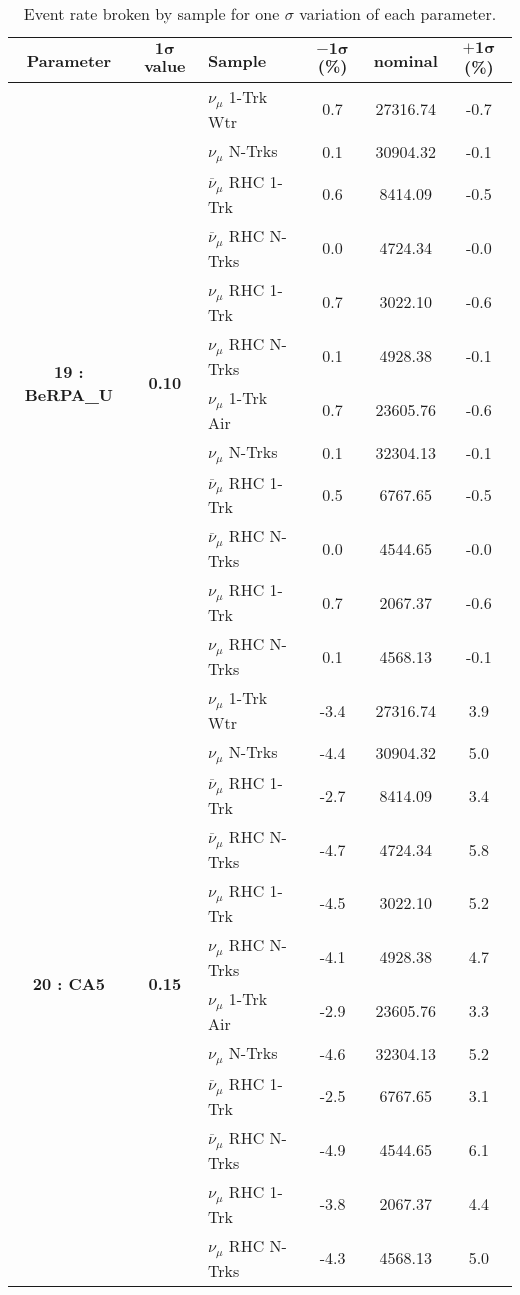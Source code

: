 \addtocounter{table}{-1}
\begin{table}[ht!]
\centering
\begin{tabular}{ c  c  l  c  c  c }
\midrule[1.3pt]
\textbf{Parameter} & \textbf{$\mathbf{1\sigma}$ value} & \textbf{Sample} & \textbf{$\mathbf{-1\sigma}$ (\%)}  &  \textbf{nominal}  &  \textbf{$\mathbf{+1\sigma}$ (\%)} \\
\midrule[1.3pt]
\multirow{12}{*}{\textbf{19 : BeRPA\_U}} & \multirow{12}{*}{\textbf{0.10}} & $\nu_\mu$ 1-Trk Wtr &   0.7 &  27316.74 &   -0.7 \\ 
 &  & $\nu_\mu$ N-Trks &   0.1 &  30904.32 &   -0.1 \\ 
 &  & $\overline{\nu}_\mu$ RHC 1-Trk &   0.6 &  8414.09 &   -0.5 \\ 
 &  & $\overline{\nu}_\mu$ RHC N-Trks &   0.0 &  4724.34 &   -0.0 \\ 
 &  & $\nu_\mu$ RHC 1-Trk &   0.7 &  3022.10 &   -0.6 \\ 
 &  & $\nu_\mu$ RHC N-Trks &   0.1 &  4928.38 &   -0.1 \\ 
 &  & $\nu_\mu$ 1-Trk Air &   0.7 &  23605.76 &   -0.6 \\ 
 &  & $\nu_\mu$ N-Trks &   0.1 &  32304.13 &   -0.1 \\ 
 &  & $\overline{\nu}_\mu$ RHC 1-Trk &   0.5 &  6767.65 &   -0.5 \\ 
 &  & $\overline{\nu}_\mu$ RHC N-Trks &   0.0 &  4544.65 &   -0.0 \\ 
 &  & $\nu_\mu$ RHC 1-Trk &   0.7 &  2067.37 &   -0.6 \\ 
 &  & $\nu_\mu$ RHC N-Trks &   0.1 &  4568.13 &   -0.1 \\ 
\midrule[1.3pt]
\multirow{12}{*}{\textbf{20 : CA5}} & \multirow{12}{*}{\textbf{0.15}} & $\nu_\mu$ 1-Trk Wtr &   -3.4 &  27316.74 &   3.9 \\ 
 &  & $\nu_\mu$ N-Trks &   -4.4 &  30904.32 &   5.0 \\ 
 &  & $\overline{\nu}_\mu$ RHC 1-Trk &   -2.7 &  8414.09 &   3.4 \\ 
 &  & $\overline{\nu}_\mu$ RHC N-Trks &   -4.7 &  4724.34 &   5.8 \\ 
 &  & $\nu_\mu$ RHC 1-Trk &   -4.5 &  3022.10 &   5.2 \\ 
 &  & $\nu_\mu$ RHC N-Trks &   -4.1 &  4928.38 &   4.7 \\ 
 &  & $\nu_\mu$ 1-Trk Air &   -2.9 &  23605.76 &   3.3 \\ 
 &  & $\nu_\mu$ N-Trks &   -4.6 &  32304.13 &   5.2 \\ 
 &  & $\overline{\nu}_\mu$ RHC 1-Trk &   -2.5 &  6767.65 &   3.1 \\ 
 &  & $\overline{\nu}_\mu$ RHC N-Trks &   -4.9 &  4544.65 &   6.1 \\ 
 &  & $\nu_\mu$ RHC 1-Trk &   -3.8 &  2067.37 &   4.4 \\ 
 &  & $\nu_\mu$ RHC N-Trks &   -4.3 &  4568.13 &   5.0 \\ 
\midrule[1.3pt]
\end{tabular}
\centering
\caption{Event rate broken by sample for one $\sigma$ variation of each parameter.}
\end{table}
